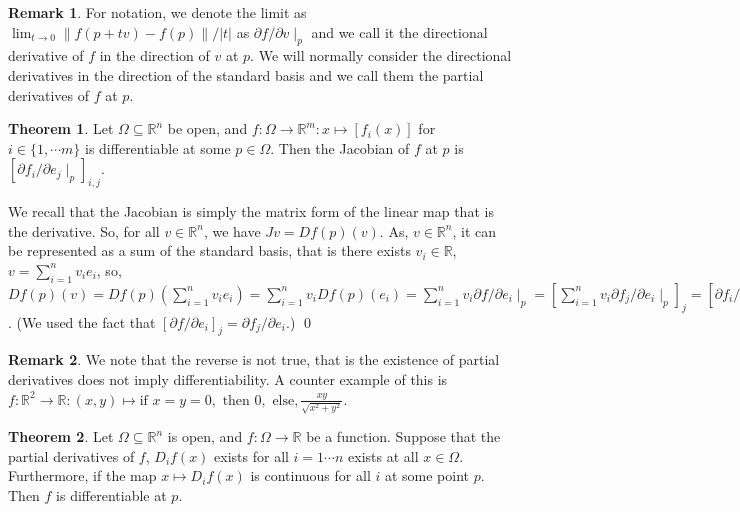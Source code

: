 \documentclass[
]{article}
\theoremstyle{definition}
\newtheorem{theorem}{Theorem}
\newtheorem*{remark}{Remark}
\theoremstyle{definition}
\begin{document}
\begin{remark}
  For notation, we denote the limit as 
  \(\lim_{t \to 0} \|f(p + tv) - f(p)\| / \left|t\right|\) as 
  \(\partial f / \partial v \mid_p\) and we call it the directional derivative 
  of \(f\) in the direction of \(v\) at \(p\). We will normally consider the 
  directional derivatives in the direction of the standard basis and we call 
  them the partial derivatives of \(f\) at \(p\).
\end{remark}

\begin{theorem}
  Let \(\Omega \subseteq \mathbb{R}^n\) be open, and 
  \(f : \Omega \to \mathbb{R}^m : x \mapsto [f_i(x)]\) for 
  \(i \in \{1, \cdots m\}\) is differentiable at some \(p \in \Omega\). Then 
  the Jacobian of \(f\) at \(p\) is \([\partial f_i / \partial e_j \mid_p]_{i, j}\).
\end{theorem} 
\proof

We recall that the Jacobian is simply the matrix form of the linear map
that is the derivative. So, for all \(v \in \mathbb{R}^n\), we have
\(J v = Df(p)(v)\). As, \(v \in \mathbb{R}^n\), it can be represented as
a sum of the standard basis, that is there exists
\(v_i \in \mathbb{R}\), \(v = \sum_{i = 1}^n v_i e_i\), so,
\(Df(p)(v) = Df(p)(\sum_{i = 1}^n v_i e_i)  = \sum_{i = 1}^n v_i Df(p)(e_i)  = \sum_{i = 1}^n v_i \partial f / \partial e_i \mid_p  = [\sum_{i = 1}^n v_i \partial f_j / \partial e_i \mid_p]_j  = [\partial f_i / \partial e_j \mid_p]_{i, j} v\).
(We used the fact that
\([\partial f / \partial e_i]_j  = \partial f_j / \partial e_i\).) \qed

\begin{remark}
  We note that the reverse is not true, that is the existence of partial 
  derivatives does not imply differentiability. A counter example of this is 
  \(f : \mathbb{R}^2 \to \mathbb{R} : (x, y) \mapsto \text{if } x = y = 0, \text{ then } 0,
  \text{ else}, \frac{xy}{\sqrt{x^2 + y^2}}\).
\end{remark}

\begin{theorem}\label{strong}
  Let \(\Omega \subseteq \mathbb{R}^n\) is open, and \(f : \Omega \to \mathbb{R}\) 
  be a function. Suppose that the partial derivatives of \(f\), \(D_i f(x)\) exists 
  for all \(i = 1 \cdots n\) exists at all \(x \in \Omega\).  Furthermore, 
  if the map \(x \mapsto D_i f(x)\) is continuous for all \(i\) at some point 
  \(p\). Then \(f\) is differentiable at \(p\).
\end{theorem}
\end{document}
